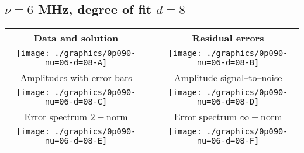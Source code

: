 

% 

\clearpage{}
\break{}

\subsection{$\nu = 6$ MHz, degree of fit $d = 8$}

\begin{table}[h]
    \begin{center}
        \begin{tabular}{ccc}
            Data and solution & \quad & Residual errors \\\hline
            \texttt{[image: ./graphics/0p090-nu=06-d=08-A]} &&
            \texttt{[image: ./graphics/0p090-nu=06-d=08-B]} \\[15pt]
            Amplitudes with error bars && Amplitude signal--to--noise \\\hline
            \texttt{[image: ./graphics/0p090-nu=06-d=08-C]} &&
            \texttt{[image: ./graphics/0p090-nu=06-d=08-D]} \\[15pt]
            Error spectrum $2-$norm && Error spectrum $\infty-$norm \\\hline
            \texttt{[image: ./graphics/0p090-nu=06-d=08-E]} &&
            \texttt{[image: ./graphics/0p090-nu=06-d=08-F]} \\[15pt]
        \end{tabular}
    \end{center}
\label{fig:elev=90, nu=6}
\end{table}



\endinput
